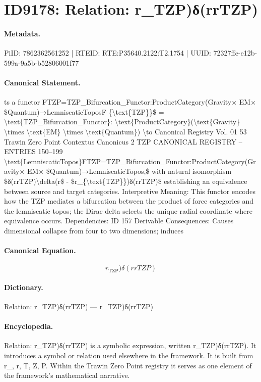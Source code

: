 \section*{ID9178: Relation: r\_TZP)δ(rrTZP)}
\paragraph{Metadata.}
PiID: 7862362561252 | RTEID: RTE:P35640.2122:T2.1754 | UUID: 72327ffe-e12b-599a-9a5b-b52806001f77

\paragraph{Canonical Statement.}
ts a functor FTZP=TZP\_Bifurcation\_Functor:ProductCategory(Gravity× EM× \$Quantum)→LemniscaticToposF \{\textbackslash{}text\{TZP\}\}\$ = \textbackslash{}text\{TZP\_Bifurcation\_Functor\}: \textbackslash{}text\{ProductCategory\}(\textbackslash{}text\{Gravity\} \textbackslash{}times \textbackslash{}text\{EM\} \textbackslash{}times \textbackslash{}text\{Quantum\}) \textbackslash{}to Canonical Registry Vol. 01 53 Trawin Zero Point Contextus Canonicus 2 TZP CANONICAL REGISTRY – ENTRIES 150–199 \textbackslash{}text\{LemniscaticTopos\}FTZP=TZP\_Bifurcation\_Functor:ProductCategory(Gravity× EM× \$Quantum)→LemniscaticTopos,\$ with natural isomorphism \$δ(rrTZP)\textbackslash{}delta(r\$ - \$r\_\{\textbackslash{}text\{TZP\}\})δ(rrTZP)\$ establishing an equivalence between source and target categories. Interpretive Meaning: This functor encodes how the TZP mediates a bifurcation between the product of force categories and the lemniscatic topos; the Dirac delta selects the unique radial coordinate where equivalence occurs. Dependencies: ID 157 Derivable Consequences: Causes dimensional collapse from four to two dimensions; induces

\paragraph{Canonical Equation.}
\[
r_{\text{TZP}})δ(rrTZP)
\]

\paragraph{Dictionary.}
Relation: r\_TZP)δ(rrTZP) — r\_TZP)δ(rrTZP)

\paragraph{Encyclopedia.}
Relation: r\_TZP)δ(rrTZP) is a symbolic expression, written r\_TZP)δ(rrTZP). It introduces a symbol or relation used elsewhere in the framework. It is built from r\_, r, T, Z, P. Within the Trawin Zero Point registry it serves as one element of the framework's mathematical narrative.
